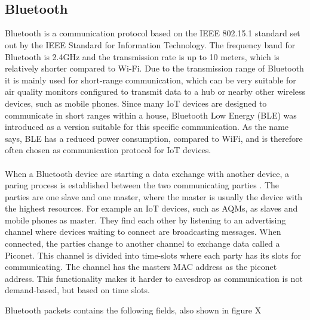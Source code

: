 \\\\
\subsection{Bluetooth}
Bluetooth is a communication protocol based on the IEEE 802.15.1 standard set out by the IEEE Standard for Information Technology. The frequency band for Bluetooth is 2.4GHz and the transmission rate is up to 10 meters, which is relatively shorter compared to Wi-Fi. \cite{IAQMonitorCommunicationReview} Due to the transmission range of Bluetooth it is mainly used for short-range communication, which can be very suitable for air quality monitors configured to transmit data to a hub or nearby other wireless devices, such as mobile phones. Since many IoT devices are designed to communicate in short ranges within a house, Bluetooth Low Energy (BLE) was introduced as a version suitable for this specific communication. \cite{SecurityofCommunicationProt} As the name says, BLE has a reduced power consumption, compared to WiFi, and is therefore often chosen as communication protocol for IoT devices. 
\\\\
When a Bluetooth device are starting a data exchange with another device, a paring process is established between the two communicating parties \cite{BluetoothCommunication}. The parties are one slave and one master, where the master is usually the device with the highest resources. For example an IoT devices, such as AQMs, as slaves and mobile phones as master. They find each other by listening to an advertising channel where devices waiting to connect are broadcasting messages. When connected, the parties change to another channel to exchange data called a Piconet. This channel is divided into time-slots where each party has its slots for communicating. The channel has the masters MAC address as the piconet address. This functionality makes it harder to eavesdrop as communication is not demand-based, but based on time slots. 

Bluetooth packets contains the following fields, also shown in figure X

